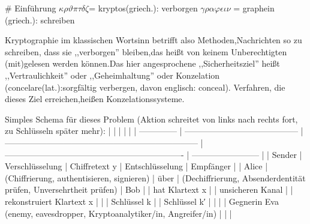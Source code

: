 \documentclass[a4paper]{article}
\begin{document}
\raggedright
\begin{multicols}{3}\scriptsize
    \setlength{\premulticols}{1pt}
    \setlength{\postmulticols}{1pt}
    \setlength{\multicolsep}{1pt}
    \setlength{\columnsep}{2pt}

# Einführung
$\kappa\rho\vartheta\pi\tau\delta\zeta$= kryptos(griech.): verborgen
$\gamma\rho\alpha\varphi\epsilon\iota\nu$ = graphein (griech.): schreiben

Kryptographie im klassischen Wortsinn betrifft also Methoden,Nachrichten so zu schreiben, dass sie ,,verborgen'' bleiben,das heißt von keinem Unberechtigten (mit)gelesen werden können.Das hier angesprochene ,,Sicherheitsziel'' heißt ,,Vertraulichkeit'' oder ,,Geheimhaltung'' oder Konzelation (concelare(lat.):sorgfältig verbergen, davon englisch: conceal). Verfahren, die dieses Ziel erreichen,heißen Konzelationssysteme.

Simples Schema für dieses Problem (Aktion schreitet von links nach rechts fort, zu Schlüsseln später mehr):
|                |                                           |                                                                       |                                                                  |
| -------------- | ----------------------------------------- | --------------------------------------------------------------------- | ---------------------------------------------------------------- | ------------------------ |
| Sender         | Verschlüsselung                           | Chiffretext y                                                         | Entschlüsselung                                                  | Empfänger                |
| Alice          | (Chiffrierung, authentisieren, signieren) | über                                                                  | (Dechiffrierung, Absenderdentität prüfen, Unversehrtheit prüfen) | Bob                      |
| hat Klartext x |                                           | unsicheren Kanal                                                      |                                                                  | rekonstruiert Klartext x |
|                | Schlüssel k                               |                                                                       | Schlüssel k′                                                     |
|                |                                           | Gegnerin Eva (enemy, eavesdropper, Kryptoanalytiker/in, Angreifer/in) |                                                                  |                          |


\end{multicols}
\end{document}
